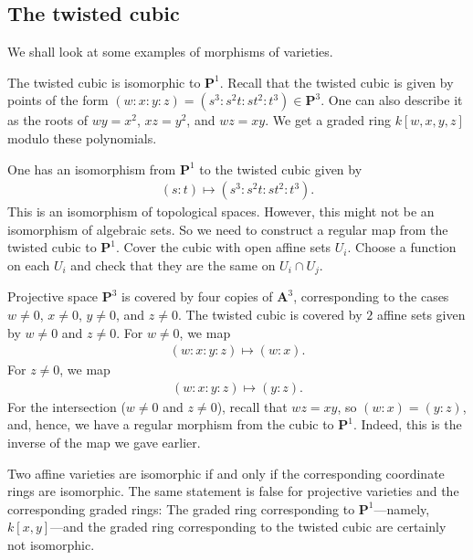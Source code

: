 \documentclass [11 pt, oneside, margin = 1 in] {article}
\begin{document}
\subsection{The twisted cubic}
We shall look at some examples of morphisms of varieties.

\begin{example}\label{}\text{}
The twisted cubic is isomorphic to $\mathbf{P}^1$. Recall that the twisted cubic is given by points of the form $(w:x:y:z) = (s^3:s^2t:st^2:t^3)\in  \mathbf{P}^3$. One can also describe it as the roots of $wy=x^2$, $xz=y^2$, and $wz=xy$. We get a graded ring $k[w,x,y,z]$ modulo these polynomials.

One has an isomorphism from $\mathbf{P}^1$ to the twisted cubic given by 
\begin{align*}
	(s:t) \longmapsto  (s^3:s^2t:st^2:t^3).
\end{align*}
This is an isomorphism of topological spaces. However, this might not be an isomorphism of algebraic sets. So we need to construct a regular map from the twisted cubic to $\mathbf{P}^1$. Cover the cubic with open affine sets $U_i$. Choose a function on each $U_i$ and check that they are the same on $U_i\cap U_j$.

Projective space $\mathbf{P}^3$ is covered by four copies of $\mathbf{A}^3$, corresponding to the cases $w\ne 0$, $x\ne 0$, $y\ne 0$, and $z\ne 0$. The twisted cubic is covered by $2$ affine sets given by $w\ne 0$ and $z\ne 0$. For $w\ne 0$, we map
\begin{align*}
	(w:x:y:z)\longmapsto  (w:x).
\end{align*}
For $z\ne 0$, we map
\begin{align*}
	(w:x:y:z)\longmapsto  (y:z).
\end{align*}
For the intersection ($w\ne 0$ and $z\ne 0$), recall that $wz=xy$, so $(w:x)= (y:z)$, and, hence, we have a regular morphism from the cubic to $\mathbf{P}^1$. Indeed, this is the inverse of the map we gave earlier.
\end{example}

\begin{remark}
	Two affine varieties are isomorphic if and only if the corresponding coordinate rings are isomorphic. The same statement is false for projective varieties and the corresponding graded rings: The graded ring corresponding to $\mathbf{P}^1$---namely, $k[x,y]$---and the graded ring corresponding to the twisted cubic are certainly not isomorphic.
\end{remark}
\end{document}
